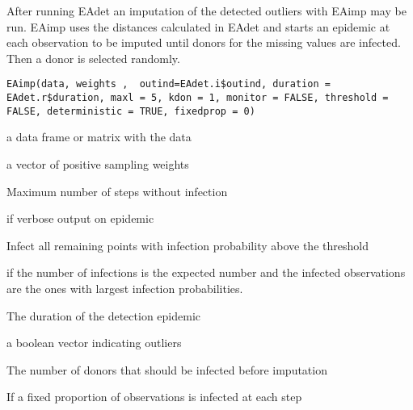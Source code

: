 %
\begin{Description}\relax
After running EAdet an imputation of the detected outliers with EAimp may be run. EAimp uses the distances calculated in EAdet and starts an epidemic at each observation to be imputed until donors for the missing values are infected. Then a donor is selected randomly. 
\end{Description}
%
\begin{Usage}
\begin{verbatim}
EAimp(data, weights ,  outind=EAdet.i$outind, duration = EAdet.r$duration, maxl = 5, kdon = 1, monitor = FALSE, threshold = FALSE, deterministic = TRUE, fixedprop = 0)
\end{verbatim}
\end{Usage}
%
\begin{Arguments}
\begin{ldescription}
\item[\code{data}] a data frame or matrix with the data
\item[\code{weights}] a vector of positive sampling weights
\item[\code{maxl}] Maximum number of steps without infection
\item[\code{monitor}] if  verbose output on epidemic
\item[\code{threshold}] Infect all remaining points with infection probability above the threshold 
\item[\code{deterministic}] if  the number of infections is the expected number and 
the infected observations are the ones with largest infection probabilities.
\item[\code{duration}] The duration of the detection epidemic
\item[\code{outind}] a boolean vector indicating outliers
\item[\code{kdon}] The number of donors that should be infected before imputation
\item[\code{fixedprop}] If  a fixed proportion of observations is infected at each step
\end{ldescription}
\end{Arguments}
%
